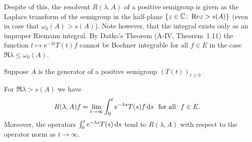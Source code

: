 Despite of this, the resolvent $R(\lambda,A)$ of a positive semigroup is given as the Laplace transform of the semigroup in the half-plane $\{z \in \mathbb{C}  \colon \mathop{}\!\mathrm{Re}  z > s(A)\}$ (even in case that $\omega_0(A) > s(A)$).
Note however, that the integral exists only as an improper Riemann integral.
By Datko's Theorem (A-IV, Theorem~1.11) the function $t \mapsto \mathrm{e}^{-\lambda t}T(t)f$ cannot be Bochner integrable for all $f \in E$ in the case $\Re  \lambda \leq \omega_0(A)$.
\begin{theorem}\label{thm:c3-1.2}
	Suppose $A$ is the generator of a positive semigroup $(T(t))_{t\geq 0}$\,.
	
	For $\Re \lambda > s(A)$ we have
	\begin{equation}\label{eq:c3-1.1}
		R(\lambda,A)f = \lim_{t\to\infty} \int_{0}^t \mathrm{e}^{-\lambda s} T(s)f \mathop{}\!\mathrm{d}{s}  \ \text{ for all } \ f \in E.
	\end{equation}
	Moreover, the operators $\int_{0}^t \mathrm{e}^{-\lambda s} T(s) \mathop{}\!\mathrm{d}{s} $ tend to $R(\lambda,A)$ with respect to the operator norm as $t \to \infty$.
\end{theorem}
